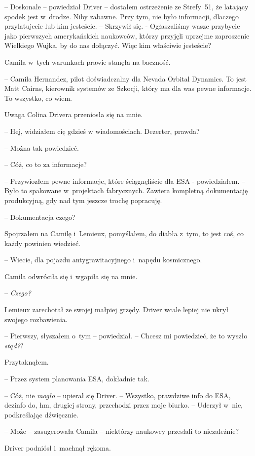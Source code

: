 \documentclass[oneside,polish,12pt,sfheadings]{mwbk}
\begin{document}
-- Doskonale -- powiedział Driver -- dostałem ostrzeżenie ze Strefy~51, że
latający spodek jest w~drodze. Niby zabawne. Przy tym, nie było
informacji, dlaczego przylatujecie lub kim jesteście. -- Skrzywił się. -
Ogłaszaliśmy wasze przybycie jako pierwszych amerykańskich naukowców,
którzy przyjęli uprzejme zaproszenie Wielkiego Wujka, by do nas
dołączyć. Więc kim właściwie jesteście?

Camila w~tych warunkach prawie stanęła na baczność.

-- Camila Hernandez, pilot doświadczalny dla Nevada Orbital Dynamics. To
jest Matt Cairns, kierownik systemów ze Szkocji, który ma dla was pewne
informacje. To wszystko, co wiem.

Uwaga Colina Drivera przeniosła się na mnie. 

-- Hej, widziałem cię gdzieś
w wiadomościach. Dezerter, prawda?

-- Można tak powiedzieć.

-- Cóż, co to za informacje?

-- Przywiozłem pewne informacje, które ściągnęliście dla ESA -
powiedziałem. -- Było to spakowane w~projektach fabrycznych. Zawiera
kompletną dokumentację produkcyjną, gdy nad tym jeszcze trochę
popracuję.

-- Dokumentacja czego?

Spojrzałem na Camilę i~Lemieux, pomyślałem, do diabła z~tym, to jest
coś, co każdy powinien wiedzieć.

-- Wiecie, dla pojazdu antygrawitacyjnego i~napędu kosmicznego.

Camila odwróciła się i~wgapiła się na mnie.

-- \emph{Czego?}

Lemieux zarechotał ze swojej małpiej grzędy. Driver wcale lepiej nie
ukrył swojego rozbawienia.

-- Pierwszy, słyszałem o~tym -- powiedział. -- Chcesz mi powiedzieć, że to
wyszło \emph{stąd?}?

Przytaknąłem. 

-- Przez system planowania ESA, dokładnie tak.

-- Cóż, nie \emph{ mogło} -- upierał się Driver. -- Wszystko, prawdziwe
info do ESA, dezinfo do, hm, drugiej strony, przechodzi przez moje
biurko. -- Uderzył w~nie, podkreślając dźwięcznie.

-- Może -- zasugerowała Camila -- niektórzy naukowcy przesłali to
niezależnie?

Driver podniósł i~machnął rękoma. 
\end{document}
